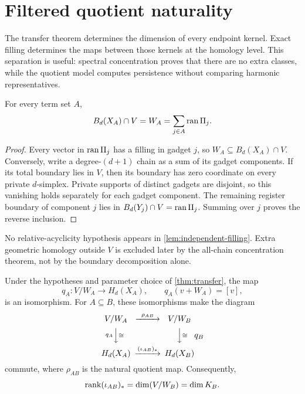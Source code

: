 \section{Filtered quotient naturality}
\label{sec:quotient}

The transfer theorem determines the dimension of every endpoint kernel. Exact filling determines the maps between those kernels at the homology level. This separation is useful: spectral concentration proves that there are no extra classes, while the quotient model computes persistence without comparing harmonic representatives.

\begin{lemma}
\label{lem:independent-filling}
For every term set \(A\),
\begin{equation}
\label{eq:boundary-intersection}
B_d(X_A)\cap V=W_A
=\sum_{j\in A}\operatorname{ran}\Pi_j.
\end{equation}
\end{lemma}

\begin{proof}
Every vector in \(\operatorname{ran}\Pi_j\) has a filling in gadget \(j\), so \(W_A\subseteq B_d(X_A)\cap V\). Conversely, write a degree-\((d+1)\) chain as a sum of its gadget components. If its total boundary lies in \(V\), then its boundary has zero coordinate on every private \(d\)-simplex. Private supports of distinct gadgets are disjoint, so this vanishing holds separately for each gadget component. The remaining register boundary of component \(j\) lies in \(B_d(Y_j)\cap V=\operatorname{ran}\Pi_j\). Summing over \(j\) proves the reverse inclusion.
\end{proof}

No relative-acyclicity hypothesis appears in \cref{lem:independent-filling}. Extra geometric homology outside \(V\) is excluded later by the all-chain concentration theorem, not by the boundary decomposition alone.

\begin{theorem}
\label{thm:quotient}
Under the hypotheses and parameter choice of \cref{thm:transfer}, the map
\begin{equation}
\label{eq:qA}
q_A:V/W_A\longrightarrow H_d(X_A),
\qquad
q_A(v+W_A)=[v],
\end{equation}
is an isomorphism. For \(A\subseteq B\), these isomorphisms make the diagram
\[
\begin{CD}
V/W_A @>{\rho_{AB}}>> V/W_B\\
@V{q_A}V{\cong}V @VV{\cong}V{q_B}\\
H_d(X_A) @>{(\iota_{AB})_*}>> H_d(X_B)
\end{CD}
\]
commute, where \(\rho_{AB}\) is the natural quotient map. Consequently,
\begin{equation}
\label{eq:persistent-rank}
\operatorname{rank}(\iota_{AB})_*
=\dim(V/W_B)
=\dim K_B.
\end{equation}
\end{theorem}

